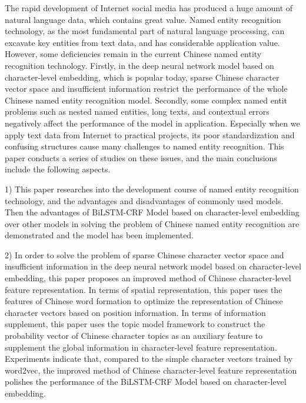 \documentclass[winfonts,master,oneside,nobackinfo]{njuthesis}
\begin{document}
\begin{englishabstract}
The rapid development of Internet social media has produced a huge amount of natural language data, which contains great value. Named entity recognition technology, as the most fundamental part of natural language processing, can excavate key entities from text data, and has considerable application value. However, some deficiencies remain in the current Chinese named entity recognition technology. Firstly, in the deep neural network model based on character-level embedding, which is popular today, sparse Chinese character vector space and insufficient information restrict the performance of the whole Chinese named entity recognition model. Secondly, some complex named entit problems such as nested named entities, long texts, and contextual errors negatively affect the performance of the model in application. Especially when we apply text data from Internet to practical projects, its poor standardization and confusing structures cause many challenges to named entity recognition. This paper conducts a series of studies on these issues, and the main conclusions include the following aspects.
 
1) This paper researches into the development course of named entity recognition technology, and the advantages and disadvantages of commonly used models. Then the advantages of BiLSTM-CRF Model based on character-level embedding over other models in solving the problem of Chinese named entity recognition are demonstrated and the model has been implemented.

2) In order to solve the problem of sparse Chinese character vector space and insufficient information in the deep neural network model based on character-level embedding, this paper proposes an improved method of Chinese character-level feature representation. In terms of spatial representation, this paper uses the features of Chinese word formation to optimize the representation of Chinese character vectors based on position information. In terms of information supplement, this paper uses the topic model framework to construct the probability vector of Chinese character topics as an auxiliary feature to supplement the global information in character-level feature representation. Experiments indicate that, compared to the simple character vectors trained by word2vec, the improved method of Chinese character-level feature representation polishes the performance of the BiLSTM-CRF Model based on character-level embedding.


\end{englishabstract}
\end{document}
